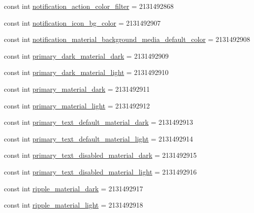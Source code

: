\begin{CompactItemize}
\item 
const int \hyperlink{class__2doo_1_1_droid_1_1_resource_1_1_color_468525a3213ef2d420fc8fd85dcbf7b8}{notification\_\-action\_\-color\_\-filter} = 2131492868
\item 
const int \hyperlink{class__2doo_1_1_droid_1_1_resource_1_1_color_f144c2ed67d0507236a802b9d04ccfd9}{notification\_\-icon\_\-bg\_\-color} = 2131492907
\item 
const int \hyperlink{class__2doo_1_1_droid_1_1_resource_1_1_color_1f68569fb775ae39f43e8f1339c54f29}{notification\_\-material\_\-background\_\-media\_\-default\_\-color} = 2131492908
\item 
const int \hyperlink{class__2doo_1_1_droid_1_1_resource_1_1_color_7030c987a34e0dbb5de25b9e2bdfe6f6}{primary\_\-dark\_\-material\_\-dark} = 2131492909
\item 
const int \hyperlink{class__2doo_1_1_droid_1_1_resource_1_1_color_a396c6d1a66e40e9e134001dc26ff285}{primary\_\-dark\_\-material\_\-light} = 2131492910
\item 
const int \hyperlink{class__2doo_1_1_droid_1_1_resource_1_1_color_a606a64bd9a1e60d5608e7729969c128}{primary\_\-material\_\-dark} = 2131492911
\item 
const int \hyperlink{class__2doo_1_1_droid_1_1_resource_1_1_color_a23bc2b4a475886d9c64f24eb421b4c0}{primary\_\-material\_\-light} = 2131492912
\item 
const int \hyperlink{class__2doo_1_1_droid_1_1_resource_1_1_color_4f3d4315608d2c775b8dd5c72f0a0df3}{primary\_\-text\_\-default\_\-material\_\-dark} = 2131492913
\item 
const int \hyperlink{class__2doo_1_1_droid_1_1_resource_1_1_color_7ffd6b1d7fc0ffdfc28abb4876ccb9ed}{primary\_\-text\_\-default\_\-material\_\-light} = 2131492914
\item 
const int \hyperlink{class__2doo_1_1_droid_1_1_resource_1_1_color_b0e59c48fcc903e630e654ecc439719f}{primary\_\-text\_\-disabled\_\-material\_\-dark} = 2131492915
\item 
const int \hyperlink{class__2doo_1_1_droid_1_1_resource_1_1_color_85c1543e1a31d10440e636761840aa78}{primary\_\-text\_\-disabled\_\-material\_\-light} = 2131492916
\item 
const int \hyperlink{class__2doo_1_1_droid_1_1_resource_1_1_color_a8e0a34683399566210838dd24ef634b}{ripple\_\-material\_\-dark} = 2131492917
\item 
const int \hyperlink{class__2doo_1_1_droid_1_1_resource_1_1_color_61fe021bd1e00d24b55e6e3c9fa95f10}{ripple\_\-material\_\-light} = 2131492918

\end{CompactItemize}
